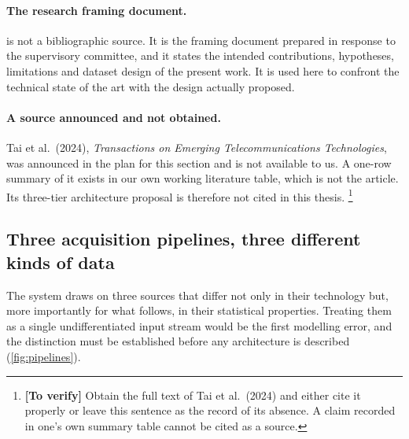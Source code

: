 \documentclass[12pt,a4paper,oneside]{report}
\newcommand{\verify}[1]{\footnote{\textbf{[To verify]} #1}}
\begin{document}
\paragraph{The research framing document.} \textcite{cadrage2026} is not a bibliographic source. It is the framing document prepared in response to the supervisory committee, and it states the intended contributions, hypotheses, limitations and dataset design of the present work. It is used here to confront the technical state of the art with the design actually proposed.

\paragraph{A source announced and not obtained.} Tai et al.\ (2024), \emph{Transactions on Emerging Telecommunications Technologies}, was announced in the plan for this section and is not available to us. A one-row summary of it exists in our own working literature table, which is not the article. Its three-tier architecture proposal is therefore not cited in this thesis.%
\verify{Obtain the full text of Tai et al.\ (2024) and either cite it properly or leave this sentence as the record of its absence. A claim recorded in one's own summary table cannot be cited as a source.}

\subsection{Three acquisition pipelines, three different kinds of data}\label{sec:pipelines}

The system draws on three sources that differ not only in their technology but, more importantly for what follows, in their statistical properties. Treating them as a single undifferentiated input stream would be the first modelling error, and the distinction must be established before any architecture is described (\cref{fig:pipelines}).
\end{document}
